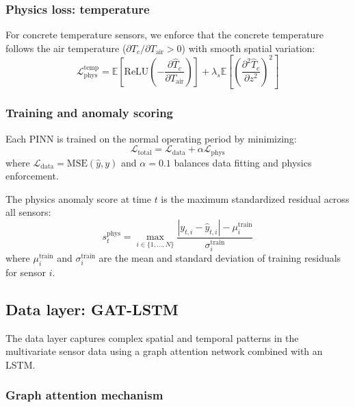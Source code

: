 \documentclass[preprint,12pt,review]{elsarticle}
\begin{document}
\subsubsection{Physics loss: temperature}

For concrete temperature sensors, we enforce that the concrete temperature follows the air temperature ($\partial T_c / \partial T_{\mathrm{air}} > 0$) with smooth spatial variation:
\begin{equation}
\mathcal{L}_{\mathrm{phys}}^{\mathrm{temp}} = \mathbb{E}\!\left[\mathrm{ReLU}\!\left(-\frac{\partial \hat{T}_c}{\partial T_{\mathrm{air}}}\right)\right] + \lambda_s \mathbb{E}\!\left[\left(\frac{\partial^2 \hat{T}_c}{\partial z^2}\right)^2\right]
\label{eq:temp_loss}
\end{equation}

\subsubsection{Training and anomaly scoring}

Each PINN is trained on the normal operating period by minimizing:
\begin{equation}
\mathcal{L}_{\mathrm{total}} = \mathcal{L}_{\mathrm{data}} + \alpha \mathcal{L}_{\mathrm{phys}}
\label{eq:pinn_total}
\end{equation}
where $\mathcal{L}_{\mathrm{data}} = \mathrm{MSE}(\hat{y}, y)$ and $\alpha = 0.1$ balances data fitting and physics enforcement.

The physics anomaly score at time $t$ is the maximum standardized residual across all sensors:
\begin{equation}
s_t^{\mathrm{phys}} = \max_{i \in \{1,\ldots,N\}} \frac{|y_{t,i} - \hat{y}_{t,i}| - \mu_i^{\mathrm{train}}}{\sigma_i^{\mathrm{train}}}
\label{eq:pinn_score}
\end{equation}
where $\mu_i^{\mathrm{train}}$ and $\sigma_i^{\mathrm{train}}$ are the mean and standard deviation of training residuals for sensor $i$.

\subsection{Data layer: GAT-LSTM}
\label{sec:gatlstm}

The data layer captures complex spatial and temporal patterns in the multivariate sensor data using a graph attention network combined with an LSTM.

\subsubsection{Graph attention mechanism}
\end{document}

